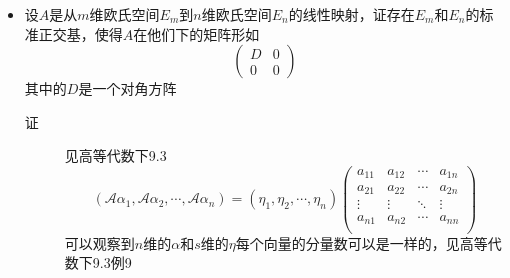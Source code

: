 \begin{itemize}
\item 设$A$是从$m$维欧氏空间$E_m$到$n$维欧氏空间$E_n$的线性映射，证存在$E_m$和$E_n$的标准正交基，使得$A$在他们下的矩阵形如
\[
\left(
\begin{array}{cc}
D & 0\\
0 & 0
\end{array}
\right)
\]
其中的$D$是一个对角方阵
\begin{description}
\item[证] 见高等代数下9.3
\[
(\mathcal{A}\alpha_1,\mathcal{A}\alpha_2,\cdots,\mathcal{A}\alpha_n)=(\eta_1,\eta_2,\cdots,\eta_n)\left(
\begin{array}{cccc}
a_{11} & a_{12} & \cdots & a_{1n}\\
a_{21} & a_{22} & \cdots & a_{2n}\\
\vdots & \vdots & \ddots & \vdots \\
a_{n1} & a_{n2} & \cdots & a_{nn}\\
\end{array}
\right)
\]
可以观察到$n$维的$\alpha$和$s$维的$\eta$每个向量的分量数可以是一样的，见高等代数下9.3例9
\end{description}


















\end{itemize}